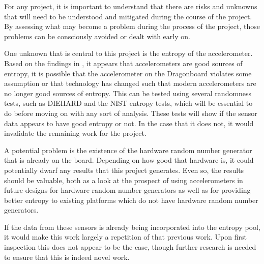 

For any project, it is important to understand that there are risks and unknowns
that will need to be understood and mitigated during the course of the project.
By assessing what may become a problem during the process of the project, those
problems can be consciously avoided or dealt with early on.

One unknown that is central to this project is the entropy of the accelerometer.
Based on the findings in \cite{voris}, it appears that accelerometers are good
sources of entropy, it is possible that the accelerometer on the Dragonboard
violates some assumption or that technology has changed such that modern
accelerometers are no longer good sources of entropy. This can be tested using
several randomness tests, such as DIEHARD and the NIST entropy tests, which will
be essential to do before moving on with any sort of analysis.  These tests will
show if the sensor data appears to have good entropy or not.  In the case that
it does not, it would invalidate the remaining work for the project. 

A potential problem is the existence of the hardware random number generator
that is already on the board. Depending on how good that hardware is, it could
potentially dwarf any results that this project generates. Even so, the results
should be valuable, both as a look at the prospect of using accelerometers in
future designs for hardware random number generators as well as for providing
better entropy to existing platforms which do not have hardware random number
generators. 

If the data from these sensors is already being incorporated into the entropy
pool, it would make this work largely a repetition of that previous work. Upon
first inspection this does not appear to be the case, though further research is
needed to ensure that this is indeed novel work.

